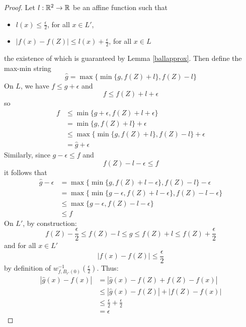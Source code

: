 \begin{proof}
Let $l: \mathbb{R}^2 \to \mathbb{R}$ be an affine function such that
\begin{itemize}
    \item $l(x) \leq \frac{\epsilon}{2}$, for all $x \in L'$,
    \item $|f(x) - f(Z)| \leq l(x) + \frac{\epsilon}{2}$, for all $x \in L$
\end{itemize}
the existence of which is guaranteed by Lemma \ref{ballapprox}. Then define the max-min string
\[\hat{g} = \operatorname{max}\lbrace \operatorname{min}\lbrace g, f(Z) + l\rbrace, f(Z) - l\rbrace\]
On $L$, we have $f \leq g + \epsilon$ and
\[f\leq f(Z) + l + \epsilon\]
so
\begin{align*}
    f &\leq \operatorname{min}\lbrace g + \epsilon, f(Z) + l + \epsilon\rbrace\\
    &= \operatorname{min}\lbrace g, f(Z) + l\rbrace + \epsilon\\
    &\leq \operatorname{max}\big\lbrace\operatorname{min}\lbrace g, f(Z) + l \rbrace, f(Z) - l\big\rbrace + \epsilon\\
    &= \hat{g} + \epsilon
\end{align*}
Similarly, since $g - \epsilon \leq f$ and
\[f(Z) - l - \epsilon \leq f\]
it follows that
\begin{align*}
    \hat{g} - \epsilon &= \operatorname{max}\big\lbrace \operatorname{min}\lbrace g, f(Z) + l - \epsilon\rbrace, f(Z) - l\big\rbrace - \epsilon\\
    &= \operatorname{max}\lbrace \operatorname{min}\lbrace g - \epsilon, f(Z) + l - \epsilon\rbrace, f(Z) - l - \epsilon\rbrace\\
    &\leq \operatorname{max}\lbrace g - \epsilon, f(Z) - l - \epsilon\rbrace\\
    &\leq f
\end{align*}
On $L'$, by construction:
\[f(Z) - \frac{\epsilon}{2} \leq f(Z) - l \leq \hat{g} \leq f(Z) + l \leq f(Z) + \frac{\epsilon}{2}\]
and for all $x \in L'$
\[|f(x) - f(Z)| \leq \frac{\epsilon}{2}\]
by definition of $w_{f,B_{r'}(0)}^{-1}(\frac{\epsilon}{2})$. Thus:
\begin{align*}
    |\hat{g}(x) - f(x)| &= |\hat{g}(x) - f(Z) + f(Z) - f(x)|\\
    &\leq |\hat{g}(x) - f(Z)| + |f(Z) - f(x)|\\
    &\leq \frac{\epsilon}{2} + \frac{\epsilon}{2}\\
    &= \epsilon
\end{align*}
%
\end{proof}

